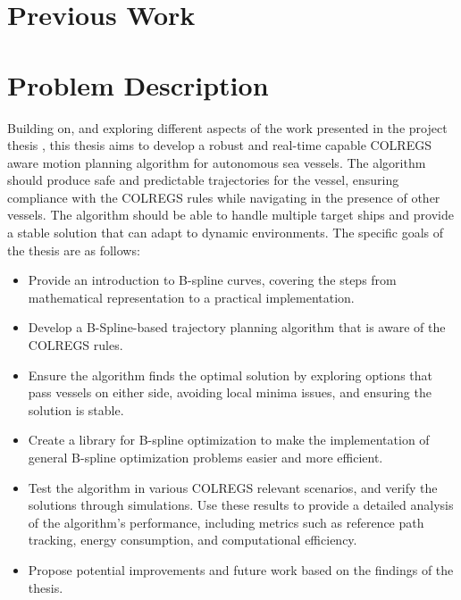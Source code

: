 


\section{Previous Work}

\section{Problem Description}
Building on, and exploring different aspects of the work presented in the project thesis \cite{prosjektoppgave}, this thesis aims to develop a robust and real-time capable COLREGS aware motion planning algorithm for autonomous sea vessels. The algorithm should produce safe and predictable trajectories for the vessel, ensuring compliance with the COLREGS rules while navigating in the presence of other vessels. The algorithm should be able to handle multiple target ships and provide a stable solution that can adapt to dynamic environments. The specific goals of the thesis are as follows:
\begin{itemize}
    \item Provide an introduction to B-spline curves, covering the steps from mathematical representation to a practical implementation.
    \item Develop a B-Spline-based trajectory planning algorithm that is aware of the COLREGS rules.
    \item Ensure the algorithm finds the optimal solution by exploring options that pass vessels on either side, avoiding local minima issues, and ensuring the solution is stable.
    \item Create a library for B-spline optimization to make the implementation of general B-spline optimization problems easier and more efficient.
    \item Test the algorithm in various COLREGS relevant scenarios, and verify the solutions through simulations. Use these results to provide a detailed analysis of the algorithm's performance, including metrics such as reference path tracking, energy consumption, and computational efficiency.
    \item Propose potential improvements and future work based on the findings of the thesis.
\end{itemize}


